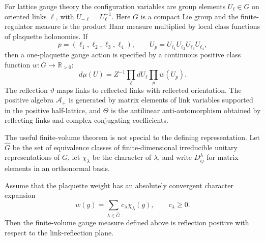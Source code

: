 For lattice gauge theory the configuration variables are group elements
\(U_\ell\in G\) on oriented links \(\ell\), with
\(U_{-\ell}=U_\ell^{-1}\).  Here \(G\) is a compact Lie group and the
finite-regulator measure is the product Haar measure multiplied by local
class functions of plaquette holonomies.  If
\[
  p=(\ell_1,\ell_2,\ell_3,\ell_4),
  \qquad
  U_p=U_{\ell_1}U_{\ell_2}U_{\ell_3}U_{\ell_4},
\]
then a one-plaquette gauge action is specified by a continuous positive
class function \(w:G\to\mathbb R_{>0}\):
\[
  d\mu(U)
  =
  Z^{-1}\prod_{\ell}dU_\ell\prod_p w(U_p).
\]
The reflection \(\vartheta\) maps links to reflected links with reflected
orientation.  The positive algebra \(\mathcal A_+\) is generated by matrix
elements of link variables supported in the positive half-lattice, and
\(\Theta\) is the antilinear anti-automorphism obtained by reflecting links
and complex conjugating coefficients.

The useful finite-volume theorem is not special to the defining
representation.  Let \(\widehat G\) be the set of equivalence classes of
finite-dimensional irreducible unitary representations of \(G\), let
\(\chi_\lambda\) be the character of \(\lambda\), and write
\(D^\lambda_{ij}\) for matrix elements in an orthonormal basis.

\begin{theorem}
\label{thm:osterwalder-seiler-character-criterion}
Assume that the plaquette weight has an absolutely convergent character
expansion
\[
  w(g)=\sum_{\lambda\in\widehat G}c_\lambda\chi_\lambda(g),
  \qquad
  c_\lambda\geq0 .
\]
Then the finite-volume gauge measure defined above is reflection positive
with respect to the link-reflection plane.
\end{theorem}

